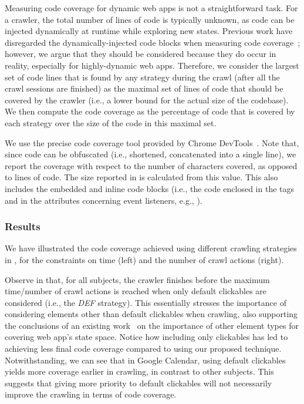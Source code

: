 Measuring \js code coverage for dynamic web apps
is not a straightforward task.
For a crawler, the total number of lines of \js code
is typically unknown,
as \js code can be
injected dynamically at runtime
while exploring new states.
Previous work have disregarded the dynamically-injected code blocks 
when measuring code coverage~\cite{artzi2011framework};
however, we argue that they should be considered because they do occur
in reality,
especially for highly-dynamic web apps.
Therefore, 
we consider the largest set of \js code lines
that is found by any strategy during the crawl
(after all the crawl sessions are finished)
as the maximal set of lines of code that should be covered by the crawler
(i.e., a lower bound for the actual size of the \js codebase).
We then compute the code coverage as the percentage of code 
that is covered by each strategy over the size of the \js code in this maximal set.

We use the precise code coverage tool provided by
Chrome DevTools~\cite{chrome-dev-tools}.
Note that, since \js code can be obfuscated (i.e., shortened, concatenated into a single line), 
we report the coverage with respect to the number of characters covered,
as opposed to lines of code.
The \js size reported in  is calculated from this value.
This also includes the embedded and inline \js code blocks
(i.e., the code enclosed in the  tags and in the \html attributes concerning event listeners, e.g., ).

\subsubsection{Results}
We have illustrated the code coverage achieved
using different crawling strategies
in ,
for the constraints on time (left) and the number of crawl actions (right).

Observe in  that, for all subjects,
the crawler finishes before the maximum time/number of crawl actions is reached
when only default clickables are considered (i.e., the \textit{DEF} strategy).
This essentially stresses the importance of considering elements 
other than default clickables when crawling,
also supporting the conclusions of an existing work~\cite{Behfarshad:2013:HiddenWeb}
on the importance of other element types for covering web app's state space.
Notice how including only clickables has led to achieving less final \js code coverage
compared to using our proposed technique.
Notwithstanding, we can see that in Google Calendar,
using default clickables yields more coverage earlier in crawling,
in contrast to other subjects.
This suggests that giving more priority to default clickables will not necessarily 
improve the crawling in terms of \js code coverage.

